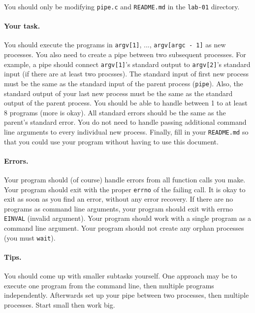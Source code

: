 You should only be modifying \texttt{pipe.c} and \texttt{README.md} in the
\texttt{lab-01} directory.

\paragraph{Your task.}

You should execute the programs in \texttt{argv[1]}, ...,
\texttt{argv[argc - 1]} as new processes.
You also need to create a pipe between two subsequent processes.
For example, a pipe should connect \texttt{argv[1]}'s standard output to
\texttt{argv[2]}'s standard input (if there are at least two procsses).
The standard input of first new process must be the same as the standard input
of the parent process (\texttt{pipe}).
Also, the standard output of your last new process must be the same as the
standard output of the parent process.
You should be able to handle between 1 to at least 8 programs (more is okay).
All standard errors should be the same as the parent's standard error.
You do not need to handle passing additional command line arguments to every
individual new process.
Finally, fill in your \texttt{README.md} so that you could use your program
without having to use this document.

\paragraph{Errors.}

Your program should (of course) handle errors from all function calls you make.
Your program should exit with the proper \texttt{errno} of the failing call.
It is okay to exit as soon as you find an error, without any error recovery.
If there are no programs as command line arguments, your program should exit
with errno \texttt{EINVAL} (invalid argument).
Your program should work with a single program as a command line argument.
Your program should not create any orphan processes (you must \texttt{wait}).

\paragraph{Tips.}

You should come up with smaller subtasks yourself.
One approach may be to execute one program from the command line, then multiple
programs independently. Afterwards set up your pipe between two processes, then
multiple processes.
Start small then work big.

